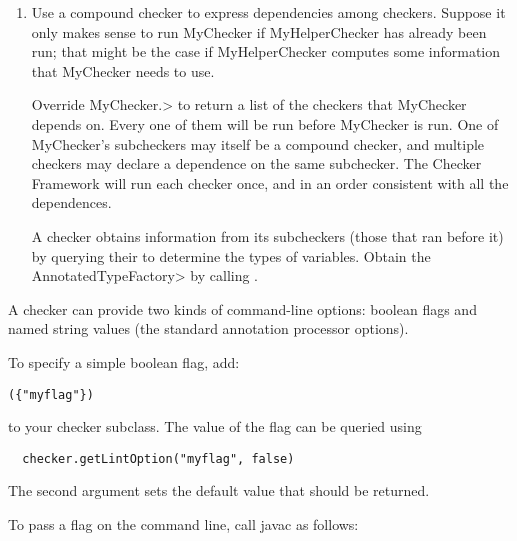 \begin{enumerate}
\item
Use a compound checker to express dependencies among checkers.  Suppose it
only makes sense to run MyChecker if MyHelperChecker has already been run;
that might be the case if MyHelperChecker computes some information that
MyChecker needs to use.

Override
\<MyChecker.>
to return a list of the checkers that MyChecker depends on.  Every one of
them will be run before MyChecker is run.  One of MyChecker's subcheckers
may itself be a compound checker, and multiple checkers may declare a
dependence on the same subchecker.  The Checker Framework will run each
checker once, and in an order consistent with all the dependences.

A checker obtains information from its subcheckers (those that ran before
it) by querying their  to
determine the types of variables.  Obtain the \<AnnotatedTypeFactory> by
calling
.

\end{enumerate}




A checker can provide two kinds of command-line options:
boolean flags and
named string values (the standard annotation processor
options).


To specify a simple boolean flag, add:

\begin{alltt}
  (\{"myflag"\})
\end{alltt}

\noindent
to your checker subclass.
The value of the flag can be queried using

\begin{Verbatim}
  checker.getLintOption("myflag", false)
\end{Verbatim}

The second argument sets the default value that should be returned.

To pass a flag on the command line, call javac as follows:

